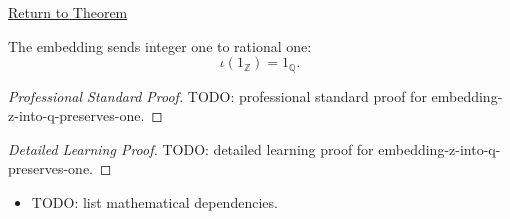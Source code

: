 \newpage
{}
\label{prf:embedding-z-into-q-preserves-one}

\begin{remark*}[Return]
\hyperref[thm:embedding-z-into-q-preserves-one]{Return to Theorem}
\end{remark*}

\begin{theorem*}
The embedding sends integer one to rational one:
\[
\iota(1_{\mathbb{Z}})=1_{\mathbb{Q}}.
\]
\end{theorem*}

\begin{proof}[Professional Standard Proof]
\LRAProofBodyStart
TODO: professional standard proof for embedding-z-into-q-preserves-one.
\end{proof}

\begin{proof}[Detailed Learning Proof]
\LRAProofBodyStart
TODO: detailed learning proof for embedding-z-into-q-preserves-one.
\end{proof}

\begin{remark*}
\end{remark*}

\begin{dependencies}
\begin{itemize}
  \item TODO: list mathematical dependencies.
\end{itemize}
\end{dependencies}

\clearpage
